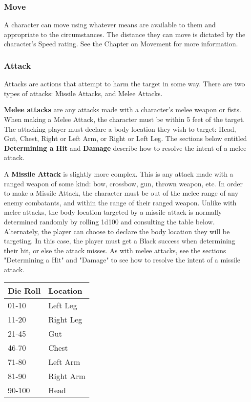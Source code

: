\documentclass[oneside]{book}
\begin{document}
\begin{multicols}{2}
\subsubsection{Move}
A character can move using whatever means are available to them and appropriate to the circumstances. The distance they can move is dictated by the character's Speed rating. See the Chapter on Movement for more information.

\subsubsection{Attack}
Attacks are actions that attempt to harm the target in some way. There are two types of attacks: Missile Attacks, and Melee Attacks.

\textbf{Melee attacks} are any attacks made with a character's melee weapon or fists. When making a Melee Attack, the character must be within 5 feet of the target. The attacking player must declare a body location they wish to target: Head, Gut, Chest, Right or Left Arm, or Right or Left Leg. The sections below entitled \textbf{Determining a Hit} and \textbf{Damage} describe how to resolve the intent of a melee attack. 

A \textbf{Missile Attack} is slightly more complex. This is any attack made with a ranged weapon of some kind: bow, crossbow, gun, thrown weapon, etc. In order to make a Missile Attack, the character must be  out of the melee range of any enemy combatants, and within the range of their ranged weapon. Unlike with melee attacks, the body location targeted by a missile attack is normally determined randomly by rolling 1d100 and consulting the table below. Alternately, the player can choose to declare the body location they will be targeting. In this case, the player must get a Black success when determining their hit, or else the attack misses. As with melee attacks, see the sections "Determining a Hit" and "Damage" to see how to resolve the intent of a missile attack. 


\begin{center}
\begin{tabular}{|l|l|}
\hline
\rowcolor[HTML]{9B9B9B} 
\textbf{Die Roll} & \textbf{Location} \\ \hline
01-10             & Left Leg          \\ \hline
\rowcolor[HTML]{EFEFEF} 
11-20             & Right Leg         \\ \hline
21-45             & Gut               \\ \hline
\rowcolor[HTML]{EFEFEF} 
46-70             & Chest             \\ \hline
71-80             & Left Arm          \\ \hline
\rowcolor[HTML]{EFEFEF} 
81-90             & Right Arm         \\ \hline
90-100            & Head              \\ \hline
\end{tabular}
\end{center}


\end{multicols}
\end{document}
